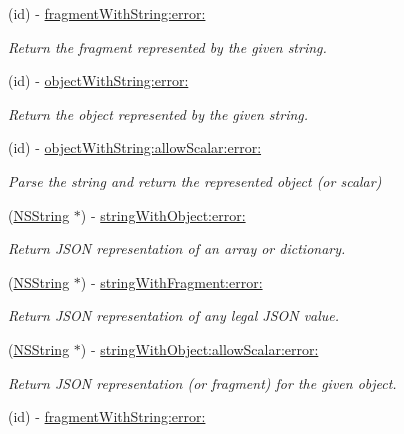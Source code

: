 \begin{DoxyCompactItemize}
\item 
(id) -\/ \hyperlink{interface_s_b_j_s_o_n_aa88f7cb9ddc4ab7fd6e9fc0853e6da6a}{fragment\-With\-String\-:error\-:}
\begin{DoxyCompactList}\small\item\em \-Return the fragment represented by the given string. \end{DoxyCompactList}\item 
(id) -\/ \hyperlink{interface_s_b_j_s_o_n_a2b0ae389a765270663c1e1110bcef613}{object\-With\-String\-:error\-:}
\begin{DoxyCompactList}\small\item\em \-Return the object represented by the given string. \end{DoxyCompactList}\item 
(id) -\/ \hyperlink{interface_s_b_j_s_o_n_a942831fa293980ad189b72860055d32a}{object\-With\-String\-:allow\-Scalar\-:error\-:}
\begin{DoxyCompactList}\small\item\em \-Parse the string and return the represented object (or scalar) \end{DoxyCompactList}\item 
(\hyperlink{class_n_s_string}{\-N\-S\-String} $\ast$) -\/ \hyperlink{interface_s_b_j_s_o_n_a830175bff0fbef8ccb82da852a154b48}{string\-With\-Object\-:error\-:}
\begin{DoxyCompactList}\small\item\em \-Return \-J\-S\-O\-N representation of an array or dictionary. \end{DoxyCompactList}\item 
(\hyperlink{class_n_s_string}{\-N\-S\-String} $\ast$) -\/ \hyperlink{interface_s_b_j_s_o_n_a9289d1d536954874498df4143c55ee80}{string\-With\-Fragment\-:error\-:}
\begin{DoxyCompactList}\small\item\em \-Return \-J\-S\-O\-N representation of any legal \-J\-S\-O\-N value. \end{DoxyCompactList}\item 
(\hyperlink{class_n_s_string}{\-N\-S\-String} $\ast$) -\/ \hyperlink{interface_s_b_j_s_o_n_adfe4a880ee09edf0c9d14508d79311d8}{string\-With\-Object\-:allow\-Scalar\-:error\-:}
\begin{DoxyCompactList}\small\item\em \-Return \-J\-S\-O\-N representation (or fragment) for the given object. \end{DoxyCompactList}\item 
\hypertarget{interface_s_b_j_s_o_n_aa88f7cb9ddc4ab7fd6e9fc0853e6da6a}{
(id) -\/ \hyperlink{interface_s_b_j_s_o_n_aa88f7cb9ddc4ab7fd6e9fc0853e6da6a}{fragment\-With\-String\-:error\-:}}
\label{interface_s_b_j_s_o_n_aa88f7cb9ddc4ab7fd6e9fc0853e6da6a}


\end{DoxyCompactItemize}
